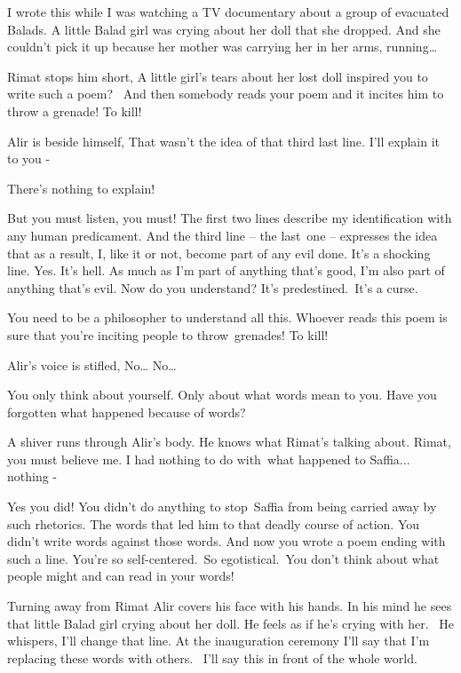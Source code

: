 \documentclass[twoside,11pt]{book}
\begin{document}
{\textquotedbl}I wrote this while I was watching a TV documentary about a group of evacuated Balads. A little Balad girl
was crying about her doll that she dropped. And she couldn't pick it up because her mother was carrying her in her
arms, running{\dots}{\textquotedbl} 

Rimat stops him short, {\textquotedbl}A little girl's tears about her lost doll inspired you to write such a poem?~ And
then somebody reads your poem and it incites him to throw a grenade! To kill!{\textquotedbl} 

Alir is beside himself, {\textquotedbl}That wasn't the idea of that third last line. I'll explain it to you
-{\textquotedbl} 

{\textquotedbl}There's nothing to explain!{\textquotedbl} 

{\textquotedbl}But you must listen, you must! The first two lines describe my identification with any human predicament.
And the third line -- the last\ one -- expresses the idea that as a result, I, like it or not, become part of any evil
done. It's a shocking line. Yes. It's hell. As much as I'm part of anything that's good, I'm also part of anything
that's evil. Now do you understand? It's predestined.\ It's a curse.{\textquotedbl} 

{\textquotedbl}You need to be a philosopher to understand all this. Whoever reads this poem is sure that you're inciting
people to throw~grenades! To kill!{\textquotedbl} 

Alir's voice is stifled, {\textquotedbl}No{\dots} No{\dots}{\textquotedbl} 

{\textquotedbl}You only think about yourself. Only about what words mean to you. Have you forgotten what happened
because of words?{\textquotedbl}

A shiver runs through Alir's body. He knows what Rimat{}'s talking about. {\textquotedbl}Rimat, you must believe me. I
had nothing to do with~what happened to Saffia... nothing - {\textquotedbl} 

{\textquotedbl}Yes you did! You didn't do anything to stop~Saffia from being carried away by such rhetorics. The words
that led him to that deadly course of action. You didn't write words against those words. And now you wrote a poem
ending with such a line. You're so self-centered.\ So
egotistical.{\ }You don't think about what people might and can read
in your words!{\textquotedbl} \ 

Turning away from Rimat Alir covers his face with his hands. In his mind he sees that little Balad girl crying about her
doll. He feels as if he's crying with her. ~He whispers, {\textquotedbl}I'll change that line. At the inauguration
ceremony I'll say that I'm replacing these words with others.~ I'll say this in front of the whole
world.{\textquotedbl}\ 
\end{document}

